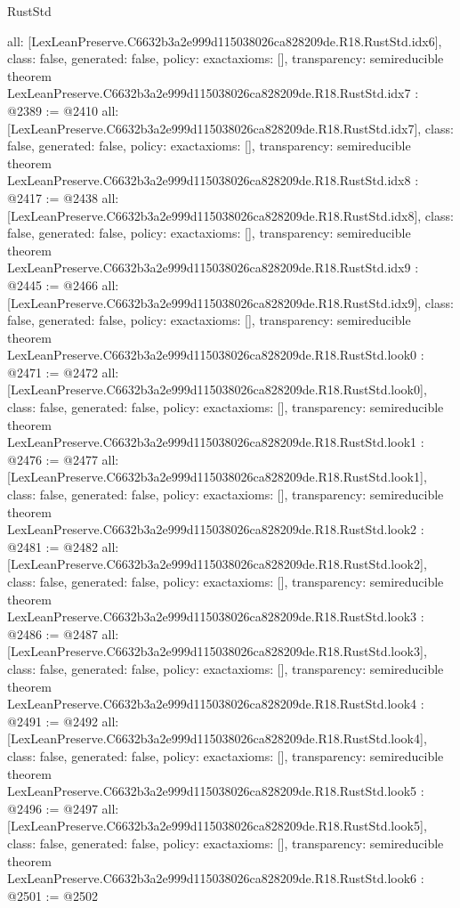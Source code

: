 \begin{lexlean}{RustStd}
\begin{coremodule}
{  all: [LexLeanPreserve.C6632b3a2e999d115038026ca828209de.R18.RustStd.idx6],
  class: false,
  generated: false,
  policy: exact{axioms: []},
  transparency: semireducible
}
theorem LexLeanPreserve.C6632b3a2e999d115038026ca828209de.R18.RustStd.idx7 : @2389 := @2410 {
  all: [LexLeanPreserve.C6632b3a2e999d115038026ca828209de.R18.RustStd.idx7],
  class: false,
  generated: false,
  policy: exact{axioms: []},
  transparency: semireducible
}
theorem LexLeanPreserve.C6632b3a2e999d115038026ca828209de.R18.RustStd.idx8 : @2417 := @2438 {
  all: [LexLeanPreserve.C6632b3a2e999d115038026ca828209de.R18.RustStd.idx8],
  class: false,
  generated: false,
  policy: exact{axioms: []},
  transparency: semireducible
}
theorem LexLeanPreserve.C6632b3a2e999d115038026ca828209de.R18.RustStd.idx9 : @2445 := @2466 {
  all: [LexLeanPreserve.C6632b3a2e999d115038026ca828209de.R18.RustStd.idx9],
  class: false,
  generated: false,
  policy: exact{axioms: []},
  transparency: semireducible
}
theorem LexLeanPreserve.C6632b3a2e999d115038026ca828209de.R18.RustStd.look0 : @2471 := @2472 {
  all: [LexLeanPreserve.C6632b3a2e999d115038026ca828209de.R18.RustStd.look0],
  class: false,
  generated: false,
  policy: exact{axioms: []},
  transparency: semireducible
}
theorem LexLeanPreserve.C6632b3a2e999d115038026ca828209de.R18.RustStd.look1 : @2476 := @2477 {
  all: [LexLeanPreserve.C6632b3a2e999d115038026ca828209de.R18.RustStd.look1],
  class: false,
  generated: false,
  policy: exact{axioms: []},
  transparency: semireducible
}
theorem LexLeanPreserve.C6632b3a2e999d115038026ca828209de.R18.RustStd.look2 : @2481 := @2482 {
  all: [LexLeanPreserve.C6632b3a2e999d115038026ca828209de.R18.RustStd.look2],
  class: false,
  generated: false,
  policy: exact{axioms: []},
  transparency: semireducible
}
theorem LexLeanPreserve.C6632b3a2e999d115038026ca828209de.R18.RustStd.look3 : @2486 := @2487 {
  all: [LexLeanPreserve.C6632b3a2e999d115038026ca828209de.R18.RustStd.look3],
  class: false,
  generated: false,
  policy: exact{axioms: []},
  transparency: semireducible
}
theorem LexLeanPreserve.C6632b3a2e999d115038026ca828209de.R18.RustStd.look4 : @2491 := @2492 {
  all: [LexLeanPreserve.C6632b3a2e999d115038026ca828209de.R18.RustStd.look4],
  class: false,
  generated: false,
  policy: exact{axioms: []},
  transparency: semireducible
}
theorem LexLeanPreserve.C6632b3a2e999d115038026ca828209de.R18.RustStd.look5 : @2496 := @2497 {
  all: [LexLeanPreserve.C6632b3a2e999d115038026ca828209de.R18.RustStd.look5],
  class: false,
  generated: false,
  policy: exact{axioms: []},
  transparency: semireducible
}
theorem LexLeanPreserve.C6632b3a2e999d115038026ca828209de.R18.RustStd.look6 : @2501 := @2502 {
}
\end{coremodule}
\end{lexlean}
